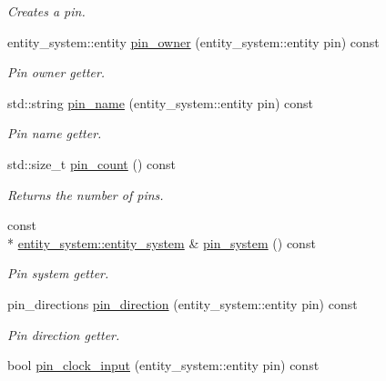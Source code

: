 \begin{DoxyCompactItemize}
\begin{DoxyCompactList}\small\item\em Creates a pin. \end{DoxyCompactList}\item 
entity\-\_\-system\-::entity \hyperlink{classophidian_1_1standard__cell_1_1standard__cells_a9ce88f364f7e66837c6768875d21ac1e}{pin\-\_\-owner} (entity\-\_\-system\-::entity pin) const 
\begin{DoxyCompactList}\small\item\em Pin owner getter. \end{DoxyCompactList}\item 
std\-::string \hyperlink{classophidian_1_1standard__cell_1_1standard__cells_a357808e456fab2325e761786b49c59a8}{pin\-\_\-name} (entity\-\_\-system\-::entity pin) const 
\begin{DoxyCompactList}\small\item\em Pin name getter. \end{DoxyCompactList}\item 
std\-::size\-\_\-t \hyperlink{classophidian_1_1standard__cell_1_1standard__cells_a144aaa53cc5d9808f5d26d51b76fad01}{pin\-\_\-count} () const 
\begin{DoxyCompactList}\small\item\em Returns the number of pins. \end{DoxyCompactList}\item 
const \\*
\hyperlink{classophidian_1_1entity__system_1_1entity__system}{entity\-\_\-system\-::entity\-\_\-system} \& \hyperlink{classophidian_1_1standard__cell_1_1standard__cells_af7e49aa525e4ac0d34582254026db007}{pin\-\_\-system} () const 
\begin{DoxyCompactList}\small\item\em Pin system getter. \end{DoxyCompactList}\item 
pin\-\_\-directions \hyperlink{classophidian_1_1standard__cell_1_1standard__cells_a8d407ff04cdf14937d320ea2d8941cf1}{pin\-\_\-direction} (entity\-\_\-system\-::entity pin) const 
\begin{DoxyCompactList}\small\item\em Pin direction getter. \end{DoxyCompactList}\item 
bool \hyperlink{classophidian_1_1standard__cell_1_1standard__cells_a460b055197ff1ef7b3c9a19b28297e87}{pin\-\_\-clock\-\_\-input} (entity\-\_\-system\-::entity pin) const 

\end{DoxyCompactItemize}
